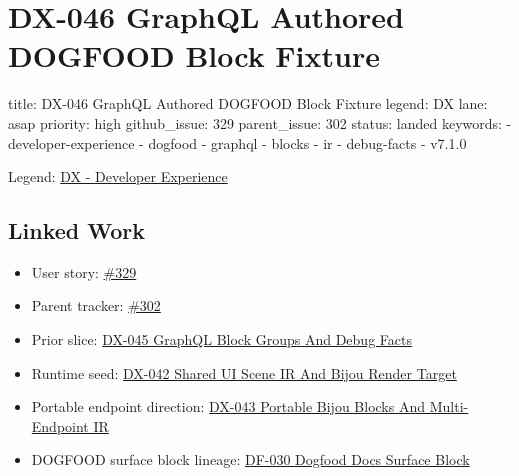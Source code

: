 \chapter{DX-046 GraphQL Authored DOGFOOD Block Fixture}\label{record-142}

\smallskip

\begin{RecordMeta}
title: DX-046 GraphQL Authored DOGFOOD Block Fixture
legend: DX
lane: asap
priority: high
github_issue: 329
parent_issue: 302
status: landed
keywords:
  - developer-experience
  - dogfood
  - graphql
  - blocks
  - ir
  - debug-facts
  - v7.1.0

\end{RecordMeta}

Legend: \href{https://github.com/flyingrobots/bijou/blob/1853ad902f6bf219326409e7f743a5a1d6517dbc/docs/legends/DX-developer-experience.md}{DX - Developer Experience}

\section{Linked Work}\label{record-142-linked-work}

\begin{itemize}
\tightlist
\item
  User story: \href{https://github.com/flyingrobots/bijou/issues/329}{\#329}
\item
  Parent tracker: \href{https://github.com/flyingrobots/bijou/issues/302}{\#302}
\item
  Prior slice: \href{https://github.com/flyingrobots/bijou/blob/cbd70612140e7a450d764b3c7be1c6af878b99bc/docs/design/DX-045-graphql-block-groups-and-debug-facts.md}{DX-045 GraphQL Block Groups And Debug Facts}
\item
  Runtime seed: \href{https://github.com/flyingrobots/bijou/blob/cbd70612140e7a450d764b3c7be1c6af878b99bc/docs/design/DX-042-shared-ui-scene-ir-and-bijou-render-target.md}{DX-042 Shared UI Scene IR And Bijou Render Target}
\item
  Portable endpoint direction: \href{https://github.com/flyingrobots/bijou/blob/cbd70612140e7a450d764b3c7be1c6af878b99bc/docs/design/DX-043-portable-bijou-blocks-and-multi-endpoint-ir.md}{DX-043 Portable Bijou Blocks And Multi-Endpoint IR}
\item
  DOGFOOD surface block lineage: \href{https://github.com/flyingrobots/bijou/blob/cbd70612140e7a450d764b3c7be1c6af878b99bc/docs/design/DF-030-dogfood-docs-surface-block.md}{DF-030 Dogfood Docs Surface Block}
\end{itemize}

